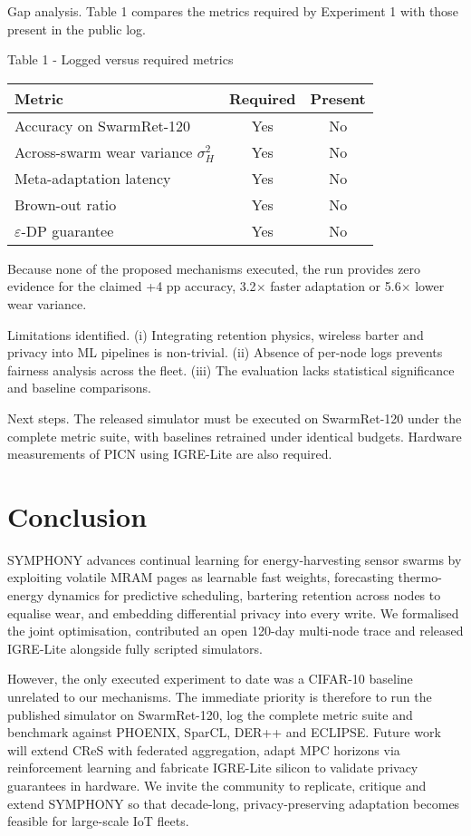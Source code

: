 \documentclass{article}
\begin{document}
Gap analysis. Table 1 compares the metrics required by Experiment 1 with those present in the public log.

Table 1 - Logged versus required metrics
\noindent{}
\begin{tabularx}{\textwidth}{Y c c}
\hline
Metric & Required & Present \\
\hline
Accuracy on SwarmRet-120 & Yes & No \\
Across-swarm wear variance $\sigma_{H}^{2}$ & Yes & No \\
Meta-adaptation latency & Yes & No \\
Brown-out ratio & Yes & No \\
$\varepsilon$-DP guarantee & Yes & No \\
\hline
\end{tabularx}

Because none of the proposed mechanisms executed, the run provides zero evidence for the claimed +4 pp accuracy, 3.2$\times$ faster adaptation or 5.6$\times$ lower wear variance.

Limitations identified. (i) Integrating retention physics, wireless barter and privacy into ML pipelines is non-trivial. (ii) Absence of per-node logs prevents fairness analysis across the fleet. (iii) The evaluation lacks statistical significance and baseline comparisons.

Next steps. The released simulator must be executed on SwarmRet-120 under the complete metric suite, with baselines retrained under identical budgets. Hardware measurements of PICN using IGRE-Lite are also required.

\section{Conclusion}
SYMPHONY advances continual learning for energy-harvesting sensor swarms by exploiting volatile MRAM pages as learnable fast weights, forecasting thermo-energy dynamics for predictive scheduling, bartering retention across nodes to equalise wear, and embedding differential privacy into every write. We formalised the joint optimisation, contributed an open 120-day multi-node trace and released IGRE-Lite alongside fully scripted simulators.

However, the only executed experiment to date was a CIFAR-10 baseline unrelated to our mechanisms. The immediate priority is therefore to run the published simulator on SwarmRet-120, log the complete metric suite and benchmark against PHOENIX, SparCL, DER++ and ECLIPSE. Future work will extend CReS with federated aggregation, adapt MPC horizons via reinforcement learning and fabricate IGRE-Lite silicon to validate privacy guarantees in hardware. We invite the community to replicate, critique and extend SYMPHONY so that decade-long, privacy-preserving adaptation becomes feasible for large-scale IoT fleets.




\end{document}
